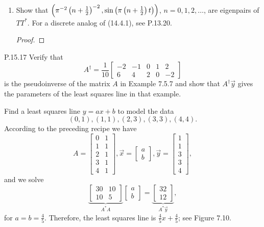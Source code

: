 \documentclass{../homework}
\begin{document}
\begin{problems}
\begin{enumerate}
  \item Show that
    \(\left( {\pi^{-2} \left( {n + \frac 1 2} \right)^{-2}, \sin\left( {\pi
        \left( {n + \frac 1 2} \right) t} \right)} \right)\), \(n = 0, 1, 2, \dots\), are
    eigenpairs of \(T T^*\).  For a discrete analog of (14.4.1), see
    P.13.20.

    \begin{solution}
      \begin{proof}

      \end{proof}
    \end{solution}
  \end{enumerate}

\item[P.15.17] Verify that
  \[
    A^\dagger = \frac{1}{10}
    \begin{bmatrix}
      -2 & -1 & 0 & 1 & 2 \\ 6 & 4 & 2 & 0 & -2
    \end{bmatrix}
  \]
  is the pseudoinverse of the matrix \(A\) in Example 7.5.7 and show
  that \(A^\dagger \vec y\) gives the parameters of the least squares
  line in that example.

  \begin{bookexample}[7.5.7]
    Find a least squares line \(y = ax + b\) to model the data
    \[
      (0,1), (1,1), (2,3), (3,3), (4,4).
    \]
    According to the preceding recipe we have
    \[
      A =
      \begin{bmatrix}
        0 & 1 \\ 1 & 1 \\ 2 & 1 \\ 3 & 1 \\ 4 & 1
      \end{bmatrix},
      \vec x = \begin{bmatrix} a \\ b \end{bmatrix},
      \vec y = \begin{bmatrix} 1 \\ 1 \\ 3 \\ 3 \\ 4 \end{bmatrix},
    \]
    and we solve
    \[
      \underbrace{
        \begin{bmatrix} 30 & 10 \\ 10 & 5 \end{bmatrix}
      }_{A^* A}
      \begin{bmatrix} a \\ b \end{bmatrix}
      = \underbrace{
        \begin{bmatrix} 32 \\ 12 \end{bmatrix}
      }_{A^* \vec y},
    \]
    for \(a = b = \frac 4 5\).  Therefore, the least squares line is
    \(\frac 4 5 x + \frac 4 5\); see Figure 7.10.
  \end{bookexample}


\end{problems}
\end{document}
